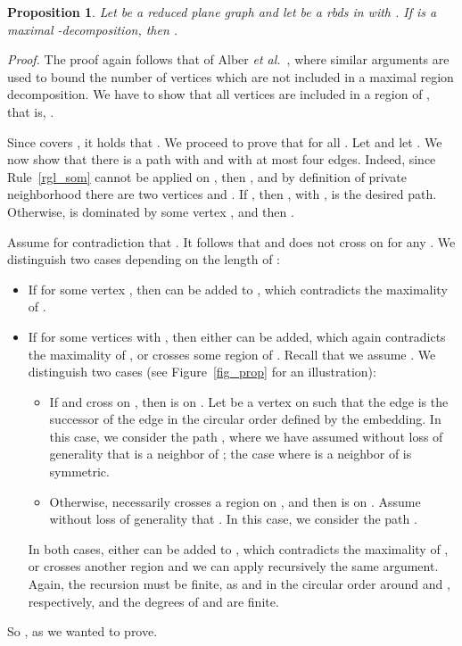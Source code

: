 \documentclass[a4paper,11pt]{article}
\newtheorem{prop} {Proposition}
\newcommand{\rrgl}   [1] {Rule~\ref{#1}\xspace}
\newcommand{\drb}    [0] {rbds\xspace}
\newenvironment{proof}{\noindent \textit{Proof. }}{\hfill\vspace{.2cm}}
\begin{document}
\begin{prop} \label{prop_nb_excl}
Let  be a reduced plane graph and let  be a \drb in  with .
If  is a maximal -decomposition, then . \end{prop}

\begin{proof} The proof again follows that of Alber \emph{et al.}~\cite[Lemma 6 and Proposition 2]{AFN04}, where similar arguments are used to bound the number of vertices which are not included in a maximal region decomposition. We have to show that all vertices are included in a region of , that is, .

Since  covers , it holds that . We proceed to prove that  for all . Let  and let . We now show that there is a path  with  and with at most four edges. Indeed, since \rrgl{rgl_som} cannot be applied on , then , and by definition of private neighborhood there are two vertices  and . If , then , with ,  is the desired path. Otherwise,  is dominated by some vertex , and then .

Assume for contradiction that . It follows that  and  does not cross  on  for any . We distinguish two cases depending on the length of :

\begin{itemize}\itemsep0em
\item If  for some vertex , then  can be added to , which contradicts the maximality of .
\item If  for some vertices  with , then either  can be added, which again contradicts the maximality of , or  crosses some region  of . Recall that we assume . We distinguish two cases (see Figure~\ref{fig_prop} for an illustration):
\begin{itemize}\itemsep0em

\item[] If  and  cross on , then  is on . Let  be a vertex on  such that the edge  is the successor of the edge  in the circular order defined by the embedding. In this case, we consider the path , where we have assumed without loss of generality that  is a neighbor  of ; the case where  is a neighbor  of  is symmetric.
\item[] Otherwise, necessarily  crosses a region  on , and then  is on . Assume without loss of generality that . In this case, we consider the path .
\end{itemize}
In both cases, either  can be added to , which contradicts the maximality of , or  crosses another region and we can apply recursively the same argument. Again, the recursion must be finite, as  and  in the circular order around  and , respectively, and the degrees of  and  are finite.
\end{itemize}
So , as we wanted to prove.


\end{proof}
\end{document}
